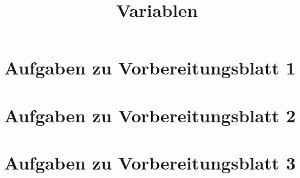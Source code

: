 \documentclass[]{uebungsblatt}
\title{Variablen}
\begin{document}
    \maketitle
    \makepreamble
    
    \section*{Aufgaben zu Vorbereitungsblatt 1}
    
    \section*{Aufgaben zu Vorbereitungsblatt 2}
    
    \section*{Aufgaben zu Vorbereitungsblatt 3}
    
    
    \newpage
    
    \begin{solutions}
        
    \end{solutions}
    
    \newpage
    
    \makehints
\end{document}

